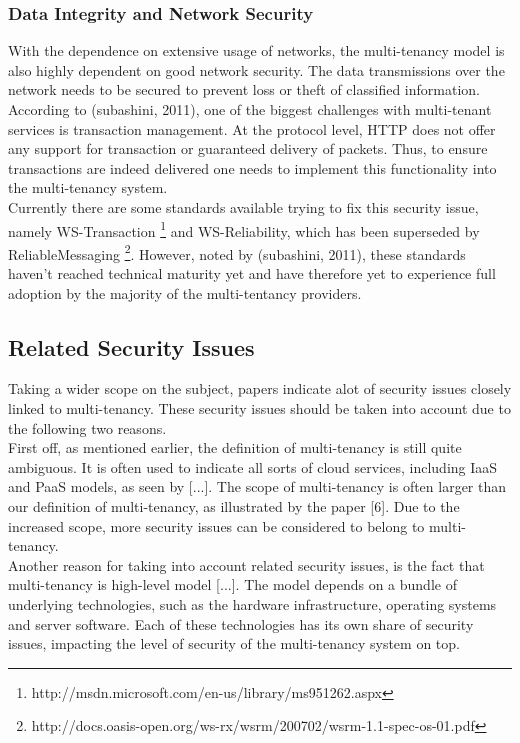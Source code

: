 \subsubsection{Data Integrity and Network Security}
With the dependence on extensive usage of networks, the multi-tenancy model is also highly dependent on good network security.  The data transmissions over the network needs to be secured to prevent loss or theft of classified information. According to (subashini, 2011), one of the biggest challenges with multi-tenant services is transaction management. At the protocol level, HTTP does not offer any support for transaction or guaranteed delivery of packets. Thus, to ensure transactions are indeed delivered one needs to implement this functionality into the multi-tenancy system.\\
	Currently there are some standards available trying to fix this security issue, namely WS-Transaction \footnote{http://msdn.microsoft.com/en-us/library/ms951262.aspx} and WS-Reliability, which has been superseded by ReliableMessaging \footnote{http://docs.oasis-open.org/ws-rx/wsrm/200702/wsrm-1.1-spec-os-01.pdf}. However, noted by (subashini, 2011), these standards haven’t reached technical maturity yet and have therefore yet to experience full adoption by the majority of the multi-tentancy providers.\\

\subsection{Related Security Issues}
Taking a wider scope on the subject, papers indicate alot of security issues closely linked to multi-tenancy. These security issues should be taken into account due to the following two reasons.\\
First off, as mentioned earlier, the definition of multi-tenancy is still quite ambiguous. It is often used to indicate all sorts of cloud services, including IaaS and PaaS models, as seen by [...]. The scope of multi-tenancy is often larger than our definition of multi-tenancy, as illustrated by the paper [6]. Due to the increased scope, more security issues can be considered to belong to multi-tenancy. \\
Another reason for taking into account related security issues, is the fact that multi-tenancy is high-level model [...]. The model depends on a bundle of underlying technologies, such as the hardware infrastructure, operating systems and server software. Each of these technologies has its own share of security issues, impacting the level of security of the multi-tenancy system on top. \\

